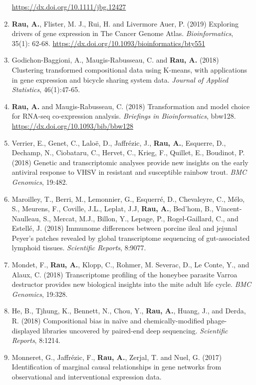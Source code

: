 \documentclass[11pt, a4paper]{awesome-cv}
\begin{document}
\begin{enumerate}
  \url{https://dx.doi.org/10.1111/jbg.12427}
\item
  \textbf{Rau, A.}, Flister, M. J., Rui, H. and Livermore Auer, P.
  (2019) Exploring drivers of gene expression in The Cancer Genome
  Atlas. \emph{Bioinformatics}, 35(1): 62-68.
  \url{https://dx.doi.org/10.1093/bioinformatics/bty551}
\item
  Godichon-Baggioni, A., Maugis-Rabusseau, C. and \textbf{Rau, A.}
  (2018) Clustering transformed compositional data using K-means, with
  applications in gene expression and bicycle sharing system data.
  \emph{Journal of Applied Statistics}, 46(1):47-65.
\item
  \textbf{Rau, A.} and Maugis-Rabusseau, C. (2018) Transformation and
  model choice for RNA-seq co-expression analysis. \emph{Briefings in
  Bioinformatics}, bbw128. \url{https://dx.doi.org/10.1093/bib/bbw128}
\item
  Verrier, E., Genet, C., Laloë, D., Jaffrézic, J., \textbf{Rau, A.},
  Esquerre, D., Dechamp, N., Ciobataru, C., Hervet, C., Krieg, F.,
  Quillet, E., Boudinot, P. (2018) Genetic and transcriptomic analyses
  provide new insights on the early antiviral response to VHSV in
  resistant and susceptible rainbow trout. \emph{BMC Genomics}, 19:482.
\item
  Maroilley, T., Berri, M., Lemonnier, G., Esquerré, D., Chevaleyre, C.,
  Mélo, S., Meurens, F., Coville, J.L., Leplat, J.J, \textbf{Rau, A.},
  Bed'hom, B., Vincent-Naulleau, S., Mercat, M.J., Billon, Y., Lepage,
  P., Rogel-Gaillard, C., and Estellé, J. (2018) Immunome differences
  between porcine ileal and jejunal Peyer's patches revealed by global
  transcriptome sequencing of gut-associated lymphoid tissues.
  \emph{Scientific Reports}, 8:9077.
\item
  Mondet, F., \textbf{Rau, A.}, Klopp, C., Rohmer, M. Severac, D., Le
  Conte, Y., and Alaux, C. (2018) Transcriptome profiling of the
  honeybee parasite Varroa destructor provides new biological insights
  into the mite adult life cycle. \emph{BMC Genomics}, 19:328.
\item
  He, B., Tjhung, K., Bennett, N., Chou, Y., \textbf{Rau, A.}, Huang,
  J., and Derda, R. (2018) Compositional bias in naïve and
  chemically-modified phage-displayed libraries uncovered by paired-end
  deep sequencing. \emph{Scientific Reports}, 8:1214.
\item
  Monneret, G., Jaffrézic, F., \textbf{Rau, A.}, Zerjal, T. and Nuel, G.
  (2017) Identification of marginal causal relationships in gene
  networks from observational and interventional expression data.

\end{enumerate}
\end{document}
